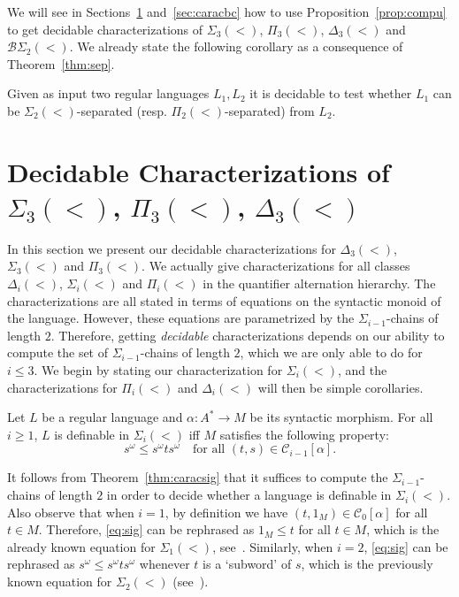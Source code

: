 \documentclass[envcountsame]{llncs}
\newcommand\Cs{\ensuremath{\mathcal{C}}\xspace}
\newcommand\Cslev[1]{\ensuremath{\Cs_{#1}}\xspace}
\newcommand{\dew}[1]{\ensuremath{\Delta_{#1}(<)}\xspace}
\newcommand{\sic}[1]{\ensuremath{\Sigma_{#1}}\xspace}
\newcommand{\siw}[1]{\ensuremath{\Sigma_{#1}(<)}\xspace}
\newcommand{\piw}[1]{\ensuremath{\Pi_{#1}(<)}\xspace}
\newcommand{\siwu}{\ensuremath{\Sigma_{1}(<)}\xspace}
\newcommand{\siwd}{\ensuremath{\Sigma_{2}(<)}\xspace}
\newcommand{\bswd}{\ensuremath{\mathcal{B}\Sigma_{2}(<)}\xspace}
\newcommand{\dewt}{\ensuremath{\Delta_{3}(<)}\xspace}
\newcommand{\siwt}{\ensuremath{\Sigma_{3}(<)}\xspace}
\newcommand{\piwt}{\ensuremath{\Pi_{3}(<)}\xspace}
\newcommand\gmo{\ensuremath{\geqslant}\xspace}
\newcommand\lmo{\ensuremath{\leqslant}\xspace}
\newcommand\qchains[1]{\ensuremath{\sic{#1}}-chains\xspace}
\begin{document}
We will see in Sections~\ref{sec:caracsi} and~\ref{sec:caracbc} how to use Proposition~\ref{prop:compu}
to get decidable characterizations of \siwt, \piwt, \dewt and  \bswd. We
already state the following corollary as a consequence of
Theorem~\ref{thm:sep}.

\begin{corollary} \label{cor:decidsep}
  Given as input two regular languages $L_1,L_2$ it is decidable to test
  whether $L_1$ can be $\siw{2}$-separated
  (resp. $\piw{2}$-separated) from $L_2$.
\end{corollary}

\section{Decidable Characterizations of \siwt, \piwt, \dewt}
\label{sec:caracsi}
In this section we present our decidable characterizations for \dewt,
\siwt and \piwt. We actually give characterizations for all classes
\dew{i}, \siw{i} and \piw{i} in the quantifier alternation hierarchy.
The characterizations are all stated in terms of equations on
the syntactic monoid of the language. However, these equations are
parametrized by the \qchains{i-1} of length $2$. Therefore, getting
\emph{decidable} characterizations depends on our ability to compute the set
of \qchains{i-1} of length $2$, which we are only able to do for
$i \lmo 3$.  We begin by stating
our characterization for \siw{i}, and the characterizations for \piw{i}
and \dew{i} will then be simple corollaries.

\begin{theorem} \label{thm:caracsig}
  Let $L$ be a regular language and $\alpha: A^* \rightarrow M$ be its
  syntactic morphism. For all $i \gmo 1$, $L$ is definable in \siw{i}
  iff $M$ satisfies the following property: 
  \begin{equation}
    s^{\omega} \lmo s^{\omega}ts^{\omega} \quad \text{for all $(t,s) \in \Cslev{i-1}[\alpha]$}. \label{eq:sig}
  \end{equation}
\end{theorem}

It follows from Theorem~\ref{thm:caracsig} that it suffices to compute
the \qchains{i-1} of length $2$ in order to decide whether a
language is definable in \siw{i}. Also observe that when $i=1$,
by definition we have $(t,1_M) \in \Cslev0[\alpha]$ for all $t \in
M$. Therefore, \eqref{eq:sig} can be rephrased as $1_M \lmo t$ for all
$t \in M$, which is the already known equation for \siwu, see~\cite{pwdelta}. Similarly, when $i=2$, \eqref{eq:sig} can be
rephrased as $s^{\omega} \lmo s^{\omega}ts^{\omega}$ whenever $t$ is a
`subword' of $s$, which is the previously known equation for \siwd
(see~\cite{pwdelta,bfacto}).
\end{document}
